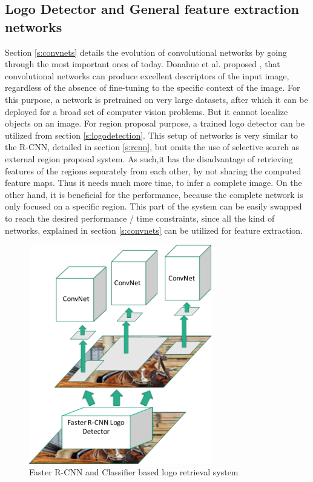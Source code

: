 \subsection{Logo Detector and General feature extraction networks}\label{ss:solution4}
Section \ref{s:convnets} details the evolution of convolutional networks by going through the most important ones of today. Donahue et al. proposed \cite{DBLP:journals/corr/DonahueJVHZTD13}, that convolutional networks can produce excellent descriptors of the input image, regardless of the absence of fine-tuning to the specific context of the image. For this purpose, a network is pretrained on very large datasets, after which it can be deployed for a broad set of computer vision problems. But it cannot localize objects on an image. For region proposal purpose, a trained logo detector can be utilized from section \ref{s:logodetection}. This setup of networks is very similar to the R-CNN, detailed in section \ref{s:rcnn}, but omits the use of selective search as external region proposal system. As such,it has the disadvantage of retrieving features of the regions separately from each other, by not sharing the computed feature maps. Thus it needs much more time, to infer a complete image. On the other hand, it is beneficial for the performance, because the complete network is only focused on a specific region. This part of the system can be easily swapped to reach the desired performance / time constraints, since all the kind of networks, explained in section \ref{s:convnets} can be utilized for feature extraction.
\begin{figure}
  \centering
  \includegraphics[width=80mm]{images/mt/det_classif.png}
  \caption{Faster R-CNN and Classifier based logo retrieval system}
  \label{f:missdet}
\end{figure}

